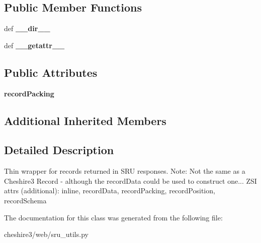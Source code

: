 \subsection*{Public Member Functions}
\begin{DoxyCompactItemize}
\item 
\hypertarget{classcheshire3_1_1web_1_1sru__utils_1_1_sru_record_ade9ac1a4f351bc09d801fd547cc23018}{def {\bfseries \-\_\-\-\_\-dir\-\_\-\-\_\-}}\label{classcheshire3_1_1web_1_1sru__utils_1_1_sru_record_ade9ac1a4f351bc09d801fd547cc23018}

\item 
\hypertarget{classcheshire3_1_1web_1_1sru__utils_1_1_sru_record_a320b4e0cfd2451ac4967eb74e31bc436}{def {\bfseries \-\_\-\-\_\-getattr\-\_\-\-\_\-}}\label{classcheshire3_1_1web_1_1sru__utils_1_1_sru_record_a320b4e0cfd2451ac4967eb74e31bc436}

\end{DoxyCompactItemize}
\subsection*{Public Attributes}
\begin{DoxyCompactItemize}
\item 
\hypertarget{classcheshire3_1_1web_1_1sru__utils_1_1_sru_record_a6a6bcb1ee8ac1d772a7fd058b35f3417}{{\bfseries record\-Packing}}\label{classcheshire3_1_1web_1_1sru__utils_1_1_sru_record_a6a6bcb1ee8ac1d772a7fd058b35f3417}

\end{DoxyCompactItemize}
\subsection*{Additional Inherited Members}


\subsection{Detailed Description}
\begin{DoxyVerb}Thin wrapper for records returned in SRU responses. 
Note: Not the same as a Cheshire3 Record - although the recordData could be used to construct one...
ZSI attrs (additional): inline, recordData, recordPacking, recordPosition, recordSchema
\end{DoxyVerb}
 

The documentation for this class was generated from the following file\-:\begin{DoxyCompactItemize}
\item 
cheshire3/web/sru\-\_\-utils.\-py\end{DoxyCompactItemize}
